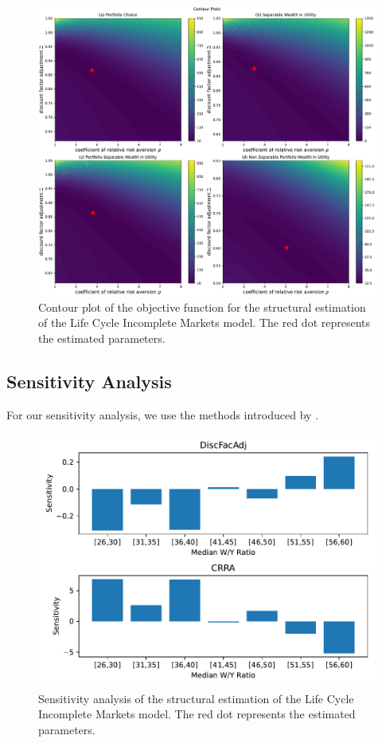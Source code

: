 \documentclass{article}
\begin{document}
\begin{figure}[!htbp]
\centering
\includegraphics[width=0.7\linewidth]{files/AllSMMcontour-a3ebf4aeb5e60dfbb487ea34f6ea9542.pdf}
\caption{Contour plot of the objective function for the structural estimation of the Life Cycle Incomplete Markets model. The red dot represents the estimated parameters.}
\label{fig:AllSMMcontour}
\end{figure}

\subsection{Sensitivity Analysis}\label{Sensitivity Analysis}

For our sensitivity analysis, we use the methods introduced by \cite{Andrews_2017}.

\begin{figure}[!htbp]
\centering
\includegraphics[width=0.7\linewidth]{files/IndShockSensitivity-31c3ae80fe69d6f8e1d2a4185c94daaf.pdf}
\caption{Sensitivity analysis of the structural estimation of the Life Cycle Incomplete Markets model. The red dot represents the estimated parameters.}
\label{fig:IndShockSensitivity}
\end{figure}
\end{document}
